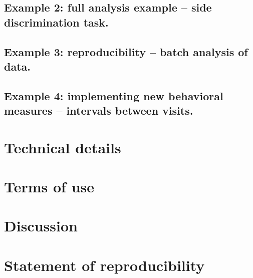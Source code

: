\documentclass[smallextended]{svjour3}       %
\begin{document}
\subsection{Example 2: full analysis example -- side discrimination task.}
\label{sec:3:2}


\subsection{Example 3: reproducibility -- batch analysis of data.}
\label{sec:3:3}


\subsection*{Example 4: implementing new behavioral measures -- intervals between visits.}
\label{sec:3:4}
 


\section{Technical details}
\label{sec:4}


\section{Terms of use}
\label{sec:5}


\section{Discussion}
\label{sec:6}


\section{Statement of reproducibility\protect\cite{peng2011}}
\label{sec:7}


\begin{acknowledgements}

\end{acknowledgements}


 
\end{document}
